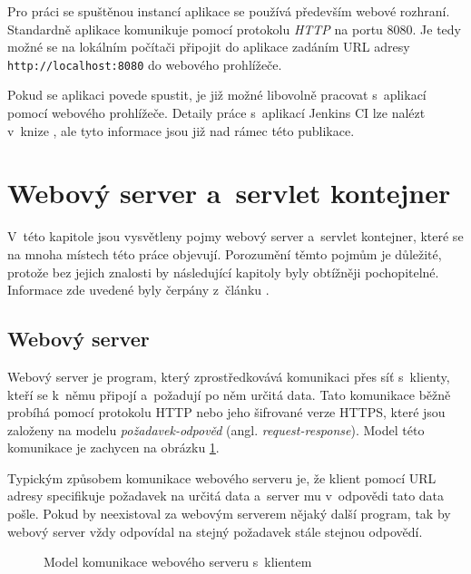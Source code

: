             Pro práci se spuštěnou instancí aplikace se používá především webové rozhraní. Standardně aplikace
            komunikuje pomocí protokolu \emph{HTTP} na portu 8080. Je tedy možné se na lokálním počítači připojit do aplikace zadáním URL adresy 
            \texttt{http://localhost:8080} do webového prohlížeče. 

            Pokud se aplikaci povede spustit, je již možné libovolně pracovat s~aplikací pomocí webového prohlížeče. Detaily práce s~aplikací Jenkins CI
            lze nalézt v~knize \cite{jenkinsBook}, ale tyto informace jsou již nad rámec této publikace.


            
       
    \section{Webový server a~servlet kontejner} \label{servletWebserver}
        V~této kapitole jsou vysvětleny pojmy webový server a~servlet kontejner, které se 
        na mnoha místech této práce objevují. Porozumění těmto pojmům je důležité, protože bez
        jejich znalosti by následující kapitoly byly obtížněji pochopitelné.
        Informace zde uvedené byly čerpány z~článku \cite{webserverVsServletPage}.

        \subsection{Webový server}
            Webový server je program, který zprostředkovává komunikaci přes síť s~klienty, kteří
            se k~němu připojí a~požadují po něm určitá data. Tato komunikace běžně probíhá pomocí protokolu HTTP
            nebo jeho šifrované verze HTTPS,
            které jsou založeny na modelu \emph{požadavek-odpověd} (angl. \emph{request-response}).
            Model této komunikace je zachycen na obrázku \ref{imgWebserver}.
            
            Typickým způsobem komunikace webového serveru je, 
            že klient pomocí URL adresy specifikuje požadavek na určitá
            data a~server mu v~odpovědi tato data pošle. Pokud by neexistoval za webovým serverem nějaký další
            program, tak by webový server vždy odpovídal na stejný požadavek stále stejnou odpovědí.

            \begin{figure}[ht]
                \begin{center}
                    \caption{Model komunikace webového serveru s~klientem}
                    \label{imgWebserver}
                \end{center}
            \end{figure}    

